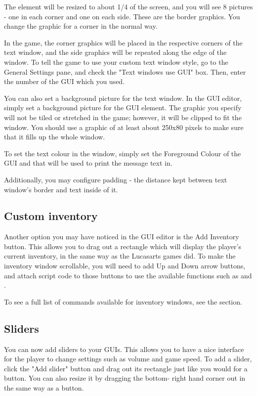 The element will be resized to about 1/4 of the screen, and you will see 8
pictures - one in each corner and one on each side. These are the border
graphics. You change the graphic for a corner in the normal way.

In the game, the corner graphics will be placed in the respective corners of
the text window, and the side graphics will be repeated along the edge of
the window. To tell the game to use your custom text window style, go to the
General Settings pane, and check the "Text windows use GUI" box. Then, enter
the number of the GUI which you used.

You can also set a background picture for the text window. In the GUI editor,
simply set a background picture for the GUI element. The graphic you specify
will not be tiled or stretched in the game; however, it will be clipped to
fit the window. You should use a graphic of at least about 250x80 pixels to
make sure that it fills up the whole window.

To set the text colour in the window, simply set the Foreground Colour of
the GUI and that will be used to print the message text in.

Additionally, you may configure padding - the distance kept between text
window's border and text inside of it.

\subsection{Custom inventory}%

Another option you may have noticed in the GUI editor is the Add Inventory
button. This allows you to drag out a rectangle which will display the
player's current inventory, in the same way as the Lucasarts games did. To
make the inventory window scrollable, you will need to add Up and Down arrow
buttons, and attach script code to those buttons to use the available
functions such as  and
.

To see a full list of commands available for inventory windows, see
the  section.

\subsection{Sliders}%

You can now add sliders to your GUIs. This allows you to have a nice interface
for the player to change settings such as volume and game speed.
To add a slider, click the "Add slider" button and drag out its rectangle just
like you would for a button. You can also resize it by dragging the bottom-
right hand corner out in the same way as a button.

